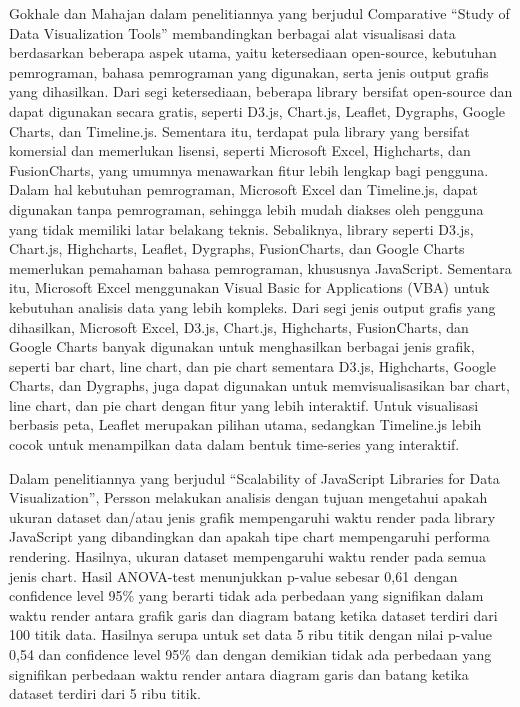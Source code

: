 Gokhale dan Mahajan \cite{Gokhale2020} dalam penelitiannya yang berjudul Comparative “Study of Data Visualization Tools” membandingkan berbagai alat visualisasi data berdasarkan beberapa aspek utama, yaitu ketersediaan open-source, kebutuhan pemrograman, bahasa pemrograman yang digunakan, serta jenis output grafis yang dihasilkan. Dari segi ketersediaan, beberapa library bersifat open-source dan dapat digunakan secara gratis, seperti D3.js, Chart.js, Leaflet, Dygraphs, Google Charts, dan Timeline.js. Sementara itu, terdapat pula library yang bersifat komersial dan memerlukan lisensi, seperti Microsoft Excel, Highcharts, dan FusionCharts, yang umumnya menawarkan fitur lebih lengkap bagi pengguna. Dalam hal kebutuhan pemrograman, Microsoft Excel dan Timeline.js, dapat digunakan tanpa pemrograman, sehingga lebih mudah diakses oleh pengguna yang tidak memiliki latar belakang teknis. Sebaliknya, library seperti D3.js, Chart.js, Highcharts, Leaflet, Dygraphs, FusionCharts, dan Google Charts memerlukan pemahaman bahasa pemrograman, khususnya JavaScript. Sementara itu, Microsoft Excel menggunakan Visual Basic for Applications (VBA) untuk kebutuhan analisis data yang lebih kompleks. Dari segi jenis output grafis yang dihasilkan, Microsoft Excel, D3.js, Chart.js, Highcharts, FusionCharts, dan Google Charts banyak digunakan untuk menghasilkan berbagai jenis grafik, seperti bar chart, line chart, dan pie chart sementara D3.js, Highcharts, Google Charts, dan Dygraphs, juga dapat digunakan untuk memvisualisasikan bar chart, line chart, dan pie chart dengan fitur yang lebih interaktif. Untuk visualisasi berbasis peta, Leaflet merupakan pilihan utama, sedangkan Timeline.js lebih cocok untuk menampilkan data dalam bentuk time-series yang interaktif.

Dalam penelitiannya yang berjudul “Scalability of JavaScript Libraries for Data Visualization”, Persson \cite{Persson2021} melakukan analisis dengan tujuan mengetahui apakah ukuran dataset dan/atau jenis grafik mempengaruhi waktu render pada library JavaScript yang dibandingkan dan apakah tipe chart mempengaruhi performa rendering. Hasilnya, ukuran dataset mempengaruhi waktu render pada semua jenis chart. Hasil ANOVA-test menunjukkan p-value sebesar 0,61 dengan confidence level 95\% yang berarti tidak ada perbedaan yang signifikan dalam waktu render antara grafik garis dan diagram batang ketika dataset terdiri dari 100 titik data. Hasilnya serupa untuk set data 5 ribu titik dengan nilai p-value 0,54 dan confidence level 95\% dan dengan demikian tidak ada perbedaan yang signifikan perbedaan waktu render antara diagram garis dan batang ketika dataset terdiri dari 5 ribu titik.

